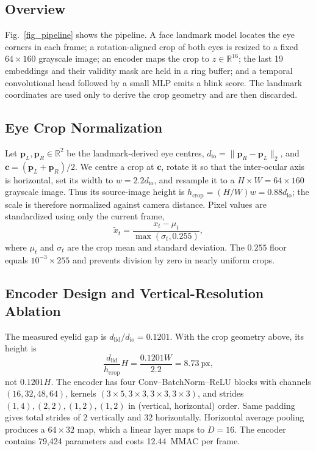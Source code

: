 \documentclass{IEEE_lsens}
\begin{document}
\subsection{Overview}
Fig.~\ref{fig_pipeline} shows the pipeline. A face landmark model
locates the eye corners in each frame; a rotation-aligned crop of both
eyes is resized to a fixed $64\times160$ grayscale image; an encoder
maps the crop to $z \in \mathbb{R}^{16}$; the last 19 embeddings and
their validity mask are held in a ring buffer; and a temporal
convolutional head followed by a small MLP emits a blink score. The
landmark coordinates are used only to derive the crop geometry and are
then discarded.

\subsection{Eye Crop Normalization}
Let $\bm p_L,\bm p_R\in\mathbb R^2$ be the landmark-derived eye centres,
$d_{\mathrm{io}}=\lVert\bm p_R-\bm p_L\rVert_2$, and
$\bm c=(\bm p_L+\bm p_R)/2$. We centre a crop at $\bm c$, rotate it so
that the inter-ocular axis is horizontal, set its width to
$w=2.2d_{\mathrm{io}}$, and resample it to a $H\times W=64\times160$
grayscale image. Thus its source-image height is
$h_{\mathrm{crop}}=(H/W)w=0.88d_{\mathrm{io}}$; the scale is therefore
normalized against camera distance. Pixel values are standardized using
only the current frame,
\begin{equation}
\tilde{x}_t=\frac{x_t-\mu_t}{\max(\sigma_t,0.255)},
\label{eq:normalization}
\end{equation}
where $\mu_t$ and $\sigma_t$ are the crop mean and standard deviation.
The $0.255$ floor equals $10^{-3}\times255$ and prevents division by
zero in nearly uniform crops.

\subsection{Encoder Design and Vertical-Resolution Ablation}
The measured eyelid gap is $d_{\mathrm{lid}}/d_{\mathrm{io}}=0.1201$.
With the crop geometry above, its height is
\begin{equation}
\frac{d_{\mathrm{lid}}}{h_{\mathrm{crop}}}H
=\frac{0.1201W}{2.2}=8.73\ \mathrm{px},
\label{eq:aperture}
\end{equation}
not $0.1201H$. The encoder has four Conv--BatchNorm--ReLU blocks with
channels $(16,32,48,64)$, kernels $(3\times5,3\times3,3\times3,3\times3)$,
and strides $(1,4),(2,2),(1,2),(1,2)$ in (vertical, horizontal) order.
Same padding gives total strides of $2$ vertically and $32$
horizontally. Horizontal average pooling produces a $64\times32$ map,
which a linear layer maps to $D=16$. The encoder contains 79,424
parameters and costs 12.44~MMAC per frame.
\end{document}
